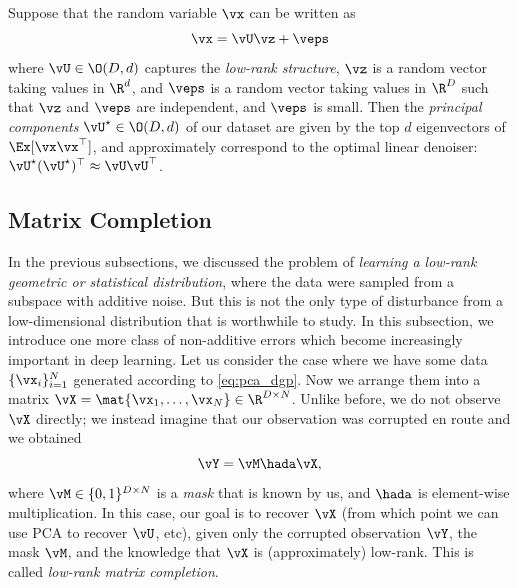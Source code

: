 \documentclass[../../book-main.tex]{subfiles}
\begin{document}
\begin{theorem}\label{thm:ppca}
    Suppose that the random variable \(\vx\) can be written as
    \begin{equation}
        \vx = \vU\vz + \veps
    \end{equation}
    where \(\vU \in \O(D, d)\) captures the \textit{low-rank structure}, \(\vz\)
    is a random vector taking values in \(\R^{d}\), and \(\veps\) is a random
    vector taking values in \(\R^{D}\) such that \(\vz\) and \(\veps\) are
    independent, and \(\veps\) is small. Then the \textit{principal components}
    \(\vU^{\star} \in \O(D, d)\) of our dataset are given by the top \(d\)
    eigenvectors of \(\Ex[\vx\vx^{\top}]\), and approximately correspond to the
    optimal linear denoiser: \(\vU^{\star}(\vU^{\star})^{\top} \approx \vU\vU^{\top}\).
\end{theorem}



\subsection{Matrix Completion}

In the previous subsections, we discussed the problem of \textit{learning a low-rank geometric or statistical distribution}, where the data were sampled from a subspace with additive noise. But this is not the only type of disturbance from a low-dimensional distribution that is worthwhile to study. In this subsection, we introduce one more class of non-additive errors which become increasingly important in deep learning. Let us consider the case where we have some data \(\{\vx_{i}\}_{i = 1}^{N}\) generated according to \eqref{eq:pca_dgp}. Now we arrange them into a matrix \(\vX = \mat{\vx_{1}, \dots, \vx_{N}} \in \R^{D \times N}\). Unlike before, we do not observe \(\vX\) directly; we instead imagine that our observation was corrupted en route and we obtained 
\begin{equation}
    \vY = \vM \hada \vX,
\end{equation}
where \(\vM \in \{0, 1\}^{D \times N}\) is a \textit{mask} that is known by us,
and \(\hada\) is element-wise multiplication. In this case, our goal is to recover \(\vX\) (from which point we can use PCA to recover \(\vU\), etc), given only the corrupted observation \(\vY\), the mask \(\vM\), and the knowledge that \(\vX\) is (approximately) low-rank. This is called \textit{low-rank matrix completion}.
\end{document}
